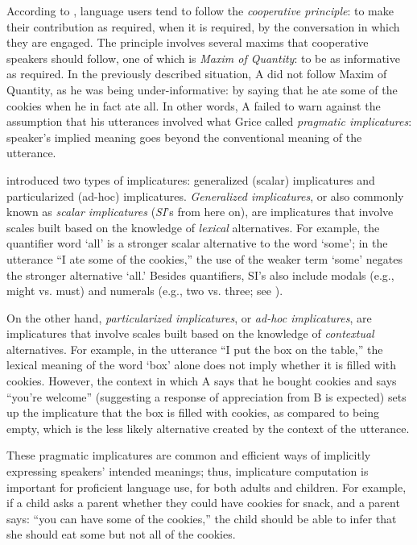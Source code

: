 \documentclass[10pt,letterpaper]{article}
\begin{document}
According to , language users tend to follow the \emph{cooperative principle}: to make their contribution as required, when it is required, by the conversation in which they are engaged. The principle involves several maxims that cooperative speakers should follow, one of which is \emph{Maxim of Quantity}: to be as informative as required. In the previously described situation, A did not follow Maxim of Quantity, as he was being under-informative: by saying that he ate some of the cookies when he in fact ate all. In other words, A failed to warn against the assumption that his utterances involved what Grice called \emph{pragmatic implicatures}: speaker's implied meaning goes beyond the conventional meaning of the utterance.

 introduced two types of implicatures: generalized (scalar) implicatures and particularized (ad-hoc) implicatures. \emph{Generalized implicatures}, or also commonly known as \emph{scalar implicatures} (\emph{SI}'s from here on), are implicatures that involve scales built based on the knowledge of \emph{lexical} alternatives. For example, the quantifier word `all' is a stronger scalar alternative to the word `some'; in the utterance ``I ate some of the cookies,'' the use of the weaker term `some' negates the stronger alternative `all.' Besides quantifiers, SI's also include modals (e.g., might vs. must) and numerals (e.g., two vs. three; see ).

On the other hand, \emph{particularized implicatures}, or \emph{ad-hoc implicatures}, are implicatures that involve scales built based on the knowledge of \emph{contextual} alternatives. For example, in the utterance ``I put the box on the table,'' the lexical meaning of the word `box' alone does not imply whether it is filled with cookies. However, the context in which A says that he bought cookies and says ``you're welcome'' (suggesting a response of appreciation from B is expected) sets up the implicature that the box is filled with cookies, as compared to being empty, which is the less likely alternative created by the context of the utterance. 

These pragmatic implicatures are common and efficient ways of implicitly expressing speakers' intended meanings; thus, implicature computation is important for proficient language use, for both adults and children. For example, if a child asks a parent whether they could have cookies for snack, and a parent says: ``you can have some of the cookies,'' the child should be able to infer that she should eat some but not all of the cookies.
\end{document}
